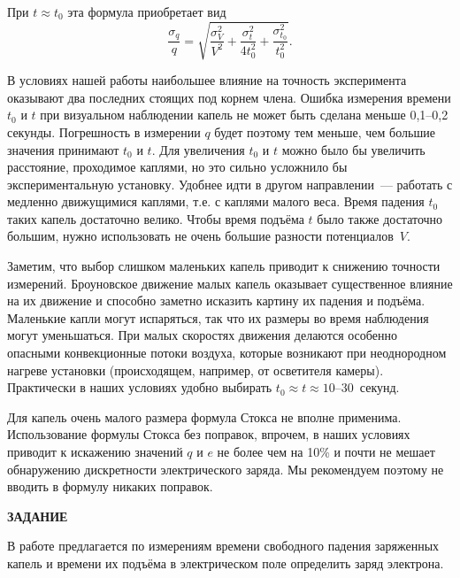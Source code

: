 При $t\approx t_0$ эта формула приобретает вид
\begin{equation}
\frac{\sigma_q}{q}=\sqrt{\frac{\sigma^2_V}{V^2}+ \frac{\sigma^2_t}{4t^2_0}+ \frac{\sigma^2_{t_0}}{t^2_0}}.
\label{eq3.3.13}
\end{equation}

В условиях нашей работы наибольшее влияние на точность эксперимента оказывают два последних стоящих под корнем члена. Ошибка измерения времени $t_0$ и $t$ при визуальном наблюдении капель не может быть сделана меньше 0,1--0,2 секунды. Погрешность в измерении $q$ будет поэтому тем меньше, чем большие значения принимают $t_0$ и $t$. Для увеличения $t_0$ и $t$ можно было бы увеличить расстояние, проходимое каплями, но это сильно усложнило бы экспериментальную установку.
Удобнее идти в другом направлении~--- работать с медленно движущимися каплями, т.е. с каплями малого веса. Время падения $t_0$ таких капель достаточно велико. Чтобы время подъёма $t$ было также достаточно большим, нужно использовать не очень большие разности потенциалов~$V$.

Заметим, что выбор слишком маленьких капель приводит к снижению точности измерений. Броуновское движение малых капель оказывает существенное влияние на их движение и способно заметно исказить картину их падения и подъёма. Маленькие капли могут испаряться, так что их размеры во время наблюдения могут уменьшаться. При малых скоростях движения делаются особенно опасными конвекционные потоки воздуха, которые возникают при неоднородном нагреве установки (происходящем, например, от осветителя камеры). Практически в наших условиях удобно выбирать $t_0\approx t\approx 10$--30~секунд.

Для капель очень малого размера формула Стокса не вполне применима. Использование формулы Стокса без поправок, впрочем, в наших условиях приводит к искажению значений $q$ и $e$ не более чем на 10\% и почти не мешает обнаружению дискретности электрического заряда. Мы рекомендуем поэтому не вводить в формулу никаких поправок.

{\Large \bf ЗАДАНИЕ}

В работе предлагается по измерениям времени свободного падения заряженных капель и времени их подъёма в электрическом поле определить заряд электрона.

